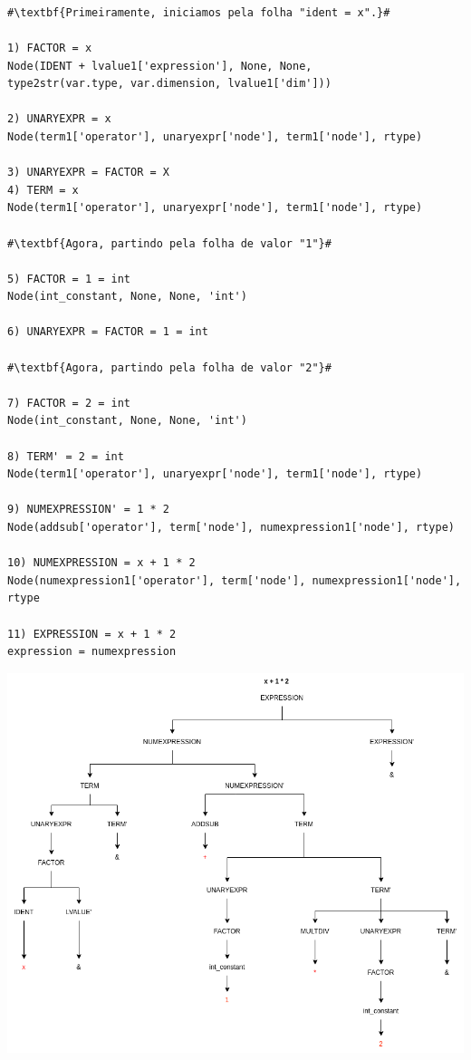 \documentclass[
	12pt,				%
	openright,			%
	twoside,			%
	a4paper,			%
	english,			%
	french,				%
	spanish,			%
	brazil				%
	]{abntex2}
\begin{document}
\begin{lstlisting}[escapechar=\#]



#\textbf{Primeiramente, iniciamos pela folha "ident = x".}#

1) FACTOR = x
Node(IDENT + lvalue1['expression'], None, None,
type2str(var.type, var.dimension, lvalue1['dim']))

2) UNARYEXPR = x
Node(term1['operator'], unaryexpr['node'], term1['node'], rtype)

3) UNARYEXPR = FACTOR = X
4) TERM = x
Node(term1['operator'], unaryexpr['node'], term1['node'], rtype) 

#\textbf{Agora, partindo pela folha de valor "1"}#

5) FACTOR = 1 = int
Node(int_constant, None, None, 'int')

6) UNARYEXPR = FACTOR = 1 = int

#\textbf{Agora, partindo pela folha de valor "2"}#

7) FACTOR = 2 = int
Node(int_constant, None, None, 'int')

8) TERM' = 2 = int
Node(term1['operator'], unaryexpr['node'], term1['node'], rtype)

9) NUMEXPRESSION' = 1 * 2
Node(addsub['operator'], term['node'], numexpression1['node'], rtype)

10) NUMEXPRESSION = x + 1 * 2
Node(numexpression1['operator'], term['node'], numexpression1['node'], rtype

11) EXPRESSION = x + 1 * 2
expression = numexpression

\end{lstlisting}

\begin{center}
\includegraphics[scale=0.6]{tree.drawio.png}
\end{center}
\end{document}
